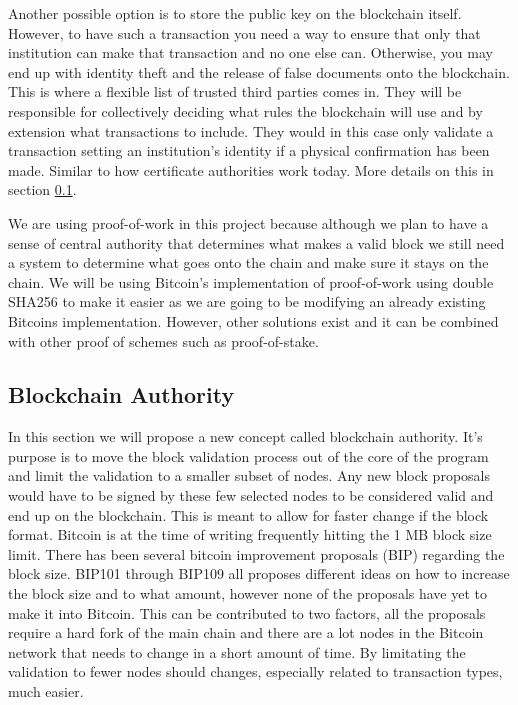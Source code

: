\documentclass[12pt]{article}
\begin{document}
Another possible option is to store the public key on the blockchain itself. However, to have such a transaction you need a way to ensure that only that institution can make that transaction and no one else can. Otherwise, you may end up with identity theft and the release of false documents onto the blockchain. This is where a flexible list of trusted third parties comes in. They will be responsible for collectively deciding what rules the blockchain will use and by extension what transactions to include. They would in this case only validate a transaction setting an institution's identity if a physical confirmation has been made. Similar to how certificate authorities work today. More details on this in section \ref{subsec:authority}.


We are using proof-of-work in this project because although we plan to have a sense of central authority that determines what makes a valid block we still need a system to determine what goes onto the chain and make sure it stays on the chain. We will be using Bitcoin's implementation of proof-of-work using double SHA256 to make it easier as we are going to be modifying an already existing Bitcoins implementation. However, other solutions exist and it can be combined with other proof of schemes such as proof-of-stake.

\subsection{Blockchain Authority}\label{subsec:authority}

In this section we will propose a new concept called blockchain authority. It's purpose is to move the block validation process out of the core of the program and limit the validation to a smaller subset of nodes. Any new block proposals would have to be signed by these few selected nodes to be considered valid and end up on the blockchain. This is meant to allow for faster change if the block format. Bitcoin is at the time of writing frequently hitting the 1 MB block size limit. There has been several bitcoin improvement proposals (BIP) regarding the block size. BIP101 through BIP109\cite{bips} all proposes different ideas on how to increase the block size and to what amount, however none of the proposals have yet to make it into Bitcoin. This can be contributed to two factors, all the proposals require a hard fork of the main chain and there are a lot nodes in the Bitcoin network that needs to change in a short amount of time. By limitating the validation to fewer nodes should changes, especially related to transaction types, much easier.
\end{document}
